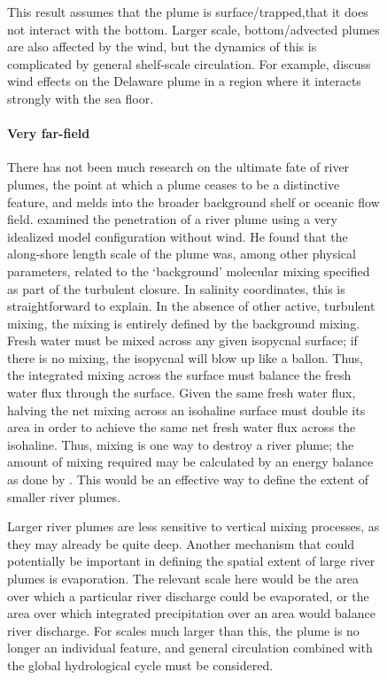 \documentclass[11pt]{report}
\numberwithin{equation}{section}
\begin{document}
\begin{figure}
This result assumes that the plume is surface\-/trapped,that it does not interact with the bottom.  Larger scale, bottom\-/advected plumes are also affected by the wind, but the dynamics of this is complicated by general shelf-scale circulation.  For example, \citet{whitney.garvine:05} discuss wind effects on the Delaware plume in a region where it interacts strongly with the sea floor.  

\paragraph{Very far-field}

There has not been much research on the ultimate fate of river plumes, the point at which a plume ceases to be a distinctive feature, and melds into the broader background shelf or oceanic flow field.  \citet{garvine:99} examined the penetration of a river plume using a very idealized model configuration without wind.  He found that the along-shore length scale of the plume was, among other physical parameters, related to the ‘background’ molecular mixing specified as part of the turbulent closure.  In salinity coordinates, this is straightforward to explain.  In the absence of other active, turbulent mixing, the mixing is entirely defined by the background mixing.  Fresh water must be mixed across any given isopycnal surface; if there is no mixing, the isopycnal will blow up like a ballon.  Thus, the integrated mixing across the surface must balance the fresh water flux through the surface.  Given the same fresh water flux, halving the net mixing across an isohaline surface must double its area in order to achieve the same net fresh water flux across the isohaline.  Thus, mixing is one way to destroy a river plume; the amount of mixing required may be calculated by an energy balance as done by \citet{pritchard.huntley:02}.  This would be an effective way to define the extent of smaller river plumes.

Larger river plumes are less sensitive to vertical mixing processes, as they may already be quite deep.  Another mechanism that could potentially be important in defining the spatial extent of large river plumes is evaporation.  The relevant scale here would be the area over which a particular river discharge could be evaporated, or the area over which integrated precipitation over an area would balance river discharge.  For scales much larger than this, the plume is no longer an individual feature, and general circulation combined with the global hydrological cycle must be considered.


\end{figure}
\end{document}
